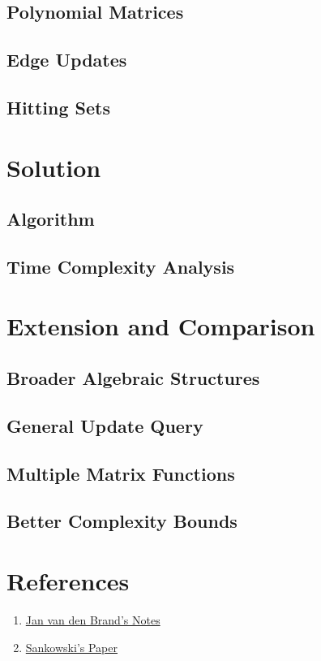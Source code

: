 \documentclass[12pt]{article}
\begin{document}
\subsection{Polynomial Matrices}
\subsection{Edge Updates}
\subsection{Hitting Sets}

\section{Solution}
\subsection{Algorithm}
\subsection{Time Complexity Analysis}

\section{Extension and Comparison}
\subsection{Broader Algebraic Structures}
\subsection{General Update Query}
\subsection{Multiple Matrix Functions}
\subsection{Better Complexity Bounds}

\section*{References}

\begin{enumerate}
    \item \href{https://www.dropbox.com/scl/fi/zjfbk8dbxbzcn05dr8l11/fall22_daa_lecturenotes.pdf?rlkey=g6z7z1hvj7jknvlpy1s3dqcjw&e=1&st=13r18doq&dl=0}{Jan van den Brand's Notes}
    \item \href{https://www.dropbox.com/scl/fi/5w4k0lg0u8e36zugapp6c/Sankowski-COCOON-05-subquadratic-dynamic-distances.pdf?rlkey=5eahwsl7a49kwxyvlr7yqyoz3&e=2&st=d3zo7owc&dl=0}{Sankowski's Paper}
\end{enumerate}
\end{document}

